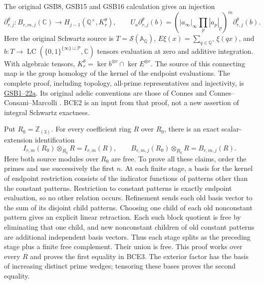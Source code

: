 The original GSB8, GSB15 and GSB16 calculation gives an injection
\begin{equation}\tag{BCE2}
\partial^\theta_{r,j}:B_{r,m,j}(\mathbb C)
 \longrightarrow H_{j-1}(\mathbb Q^\times,K_r^\theta),
\qquad
U_a\partial^\theta_{r,j}(b)
=\left(|a_\infty|_\infty\prod_p|a_p|_p\right)^m
                                  \partial^\theta_{r,j}(b).
\end{equation}
Here the original Schwartz source is \(T=\mathcal S(\mathbb A_\mathbb Q)\),
\(E\xi(x)=\sum_{q\in\mathbb Q^\times}\xi(qx)\), and \(b:T\to
\operatorname{LC}(\{0,1\}^{\{\infty\}\sqcup\mathcal P},\mathbb C)\)
tensors evaluation at zero and additive integration. With algebraic
tensors, \(K_r^\theta=\ker b^{\otimes r}\cap\ker E^{\otimes r}\).
The source of this connecting map is the group homology of the kernel
of the endpoint evaluations. The complete proof, including topology,
all-prime representatives and injectivity, is
\href{https://github.com/KokunoYumeto/zeta-function-research-reader/blob/7bb431df02b42681b3c7335fbf272a3771f777ef/workbenches/splitzero-tandem/research-self-audit/supporting_proofs/GLOBAL_SECONDARY_BOUNDARY_EVALUATION.tex#L1}
{GSB1--22a}. Its original adelic conventions are those of Connes and
Connes--Consani--Marcolli \cite{BCEConnes,BCECCM}. BCE2 is an input from that
proof, not a new assertion of integral Schwartz exactness.

Put \(R_0=\mathbb Z_{(3)}\). For every coefficient ring \(R\) over
\(R_0\), there is an exact scalar-extension identification
\begin{equation}\tag{BCE3}
I_{r,m}(R_0)\otimes_{R_0}R=I_{r,m}(R),\qquad
B_{r,m,j}(R_0)\otimes_{R_0}R=B_{r,m,j}(R).
\end{equation}
Here both source modules over \(R_0\) are free. To prove all these
claims, order the primes and use successively the first \(n\).
At each finite stage, a basis for the kernel of endpoint restriction
consists of the indicator functions of patterns other than the
constant patterns. Restriction to constant patterns is exactly
endpoint evaluation, so no other relation occurs. Refinement sends
each old basis vector to the sum of its disjoint child patterns.
Choosing one child of each old nonconstant pattern gives an explicit
linear retraction. Each such block quotient is free by eliminating
that one child, and new nonconstant children of old constant patterns
are additional independent basis vectors. Thus each stage splits as
the preceding stage plus a finite free complement. Their union is
free. This proof works over every \(R\) and proves the first equality
in BCE3. The exterior factor has the basis of increasing distinct
prime wedges; tensoring these bases proves the second equality.

